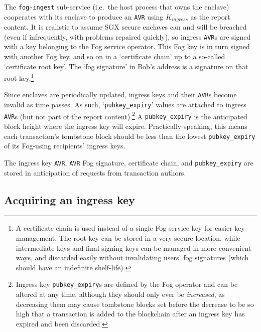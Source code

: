 The {\tt fog-ingest} sub-service (i.e.\ the host process that owns the enclave) cooperates with its enclave to produce an {\tt AVR} using $K_{ingress}$ as the report content. It is realistic to assume SGX secure enclaves can and will be breached (even if infrequently, with problems repaired quickly), so ingress {\tt AVR}s are signed with a key belonging to the Fog service operator. This Fog key is in turn signed with another Fog key, and so on in a `certificate chain' up to a so-called `certificate root key'. The `fog signature' in Bob's address is a signature on that root key.\footnote{A certificate chain is used instead of a single Fog service key for easier key management. The root key can be stored in a very secure location, while intermediate keys and final signing keys can be managed in more convenient ways, and discarded easily without invalidating users' fog signatures (which should have an indefinite shelf-life).}

Since enclaves are periodically updated, ingress keys and their {\tt AVR}s become invalid as time passes. As such, `{\tt pubkey\_expiry}' values are attached to ingress {\tt AVR}s (but not part of the report content).\footnote{Ingress key {\tt pubkey\_expiry}s are defined by the Fog operator and can be altered at any time, although they should only ever be {\em increased}, as decreasing them may cause tombstone blocks set before the decrease to be so high that a transaction is added to the blockchain after an ingress key has expired and been discarded.} A {\tt pubkey\_expiry} is the anticipated block height where the ingress key will expire. Practically speaking, this means each transaction's tombstone block should be less than the lowest {\tt pubkey\_expiry} of its Fog-using recipients' ingress keys.

The ingress key {\tt AVR}, {\tt AVR} Fog signature, certificate chain, and {\tt pubkey\_expiry} are stored in anticipation of requests from transaction authors.


\subsection{Acquiring an ingress key}
\label{subsec:fog-acquiring-incress-key}

